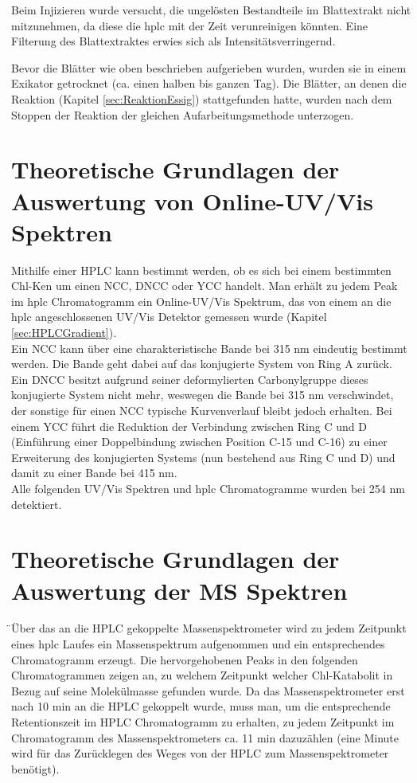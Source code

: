 Beim Injizieren wurde versucht, die ungelösten Bestandteile im Blattextrakt nicht mitzunehmen, da diese die \gls{hplc} mit der Zeit verunreinigen könnten. Eine Filterung des Blattextraktes erwies sich als Intensitätsverringernd.

Bevor die Blätter wie oben beschrieben aufgerieben wurden, wurden sie in einem Exikator getrocknet (ca. einen halben bis ganzen Tag). Die Blätter, an denen die Reaktion (Kapitel \ref{sec:ReaktionEssig}) stattgefunden hatte, wurden nach dem Stoppen der Reaktion der gleichen Aufarbeitungsmethode unterzogen. 

\section{Theoretische Grundlagen der Auswertung von Online-UV/Vis Spektren} \label{sec:IdentifikationUVVis}

Mithilfe einer HPLC kann bestimmt werden, ob es sich bei einem bestimmten \gls{Chl-K}en um einen \gls{NCC}, \gls{DNCC} oder \gls{YCC} handelt. Man erhält zu jedem Peak im \gls{hplc} Chromatogramm ein Online-UV/Vis Spektrum, das von einem an die \gls{hplc} angeschlossenen UV/Vis Detektor gemessen wurde (Kapitel \ref{sec:HPLCGradient}). \\

Ein \gls{NCC} kann über eine charakteristische Bande bei 315 nm eindeutig bestimmt werden. Die Bande geht dabei auf das konjugierte System von Ring A zurück. Ein \gls{DNCC} besitzt aufgrund seiner deformylierten Carbonylgruppe dieses konjugierte System nicht mehr, weswegen die Bande bei 315 nm verschwindet, der sonstige für einen \gls{NCC} typische Kurvenverlauf bleibt jedoch erhalten. Bei einem \gls{YCC} führt die Reduktion der Verbindung zwischen Ring C und D (Einführung einer Doppelbindung zwischen Position C-15 und C-16) zu einer Erweiterung des konjugierten Systems (nun bestehend aus Ring C und D) und damit zu einer Bande bei 415 nm. \cite{ErsterKatabolit}\\

Alle folgenden UV/Vis Spektren und \gls{hplc} Chromatogramme wurden bei 254 nm detektiert.

\section{Theoretische Grundlagen der Auswertung der MS Spektren} \label{sec:IdentifikationMS}

̈Über das an die HPLC gekoppelte Massenspektrometer wird zu jedem Zeitpunkt eines \gls{hplc} Laufes ein Massenspektrum aufgenommen und ein entsprechendes Chromatogramm erzeugt. Die hervorgehobenen Peaks in den folgenden Chromatogrammen zeigen an, zu welchem Zeitpunkt welcher Chl-Katabolit in Bezug auf seine Molekülmasse gefunden wurde. Da das Massenspektrometer erst nach 10 min an die HPLC gekoppelt wurde, muss man, um die entsprechende Retentionszeit im HPLC Chromatogramm zu erhalten, zu jedem Zeitpunkt im Chromatogramm des Massenspektrometers ca. 11 min dazuzählen (eine Minute wird für das Zurücklegen des Weges von der HPLC zum Massenspektrometer benötigt).  \\

